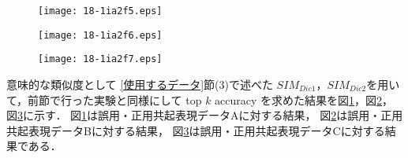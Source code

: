 \documentclass[japanese]{jnlp_1.4}
\begin{document}
\begin{figure}[b]
\begin{center}
\texttt{[image: 18-1ia2f5.eps]}
\end{center}
\label{共通topK-A}
\end{figure}

\begin{figure}[t]
\begin{center}
\texttt{[image: 18-1ia2f6.eps]}
\end{center}
\label{共通topK-B}
\end{figure}
\begin{figure}[t]
\begin{center}
\texttt{[image: 18-1ia2f7.eps]}
\end{center}
\label{共通topK-C}
\end{figure}

 意味的な類似度として \ref{使用するデータ}節(3)で述べた
 $SIM_{Dic1}$，$SIM_{Dic2}$を用いて，前節で行った実験と同様にして top
 $k$ accuracy を求めた結果を図\ref{共通topK-A}，図\ref{共通topK-B}，図\ref{共通topK-C}に示す．
図\ref{共通topK-A}は誤用・正用共起表現データAに対する結果，
図\ref{共通topK-B}は誤用・正用共起表現データBに対する結果，
図\ref{共通topK-C}は誤用・正用共起表現データCに対する結果である．
\end{document}
